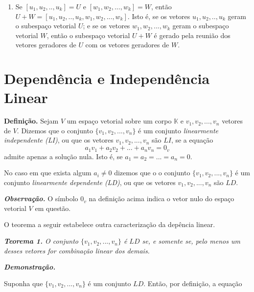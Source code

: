 \begin{enumerate}
\item  Se $[u_1,u_2,..,u_k]=U$ e $[w_1,w_2,...,w_k]=W$, então $U+W=[u_1,u_2,..,u_k, w_1,w_2,...,w_k]$. Isto é, se os vetores $u_1,u_2,..,u_k$ geram o subespaço vetorial $U$; e se os vetores $w_1,w_2,...,w_k$ geram o subespaço vetorial $W$, então o subespaço vetorial $U+W$ é gerado pela reunião dos vetores geradores de $U$ com os vetores geradores de $W$.

\end{enumerate}

\section{Dependência e Independência  Linear}

\textbf{Definição.} Sejam $V$ um espaço vetorial sobre um corpo  $\mathbb{K}$ e $v_1, v_2,..., v_n$ vetores de  $V$.  Dizemos que o conjunto $\{v_1, v_2,..., v_n\}$ é um conjunto \textit{linearmente independente (LI)}, ou que os vetores $v_1, v_2,..., v_n$  são $LI$, se a equação $$a_1v_1+a_2v_2+...+a_nv_n=0_v$$ admite apenas a solução nula.  Isto é, se $a_1=a_2=...=a_n=0$.

\vspace{0.3cm}

No caso em que exista algum $a_i \neq 0$ dizemos que o o conjunto $\{v_1, v_2,..., v_n\}$ é um conjunto \textit{linearmente dependente (LD)}, ou que os vetores $v_1, v_2,..., v_n$  são $LD$.

\vspace{0.3cm}

\textit{\textbf{Observação.}} O símbolo $0_v$ na definição acima indica o vetor nulo do espaço vetorial $V$ em questão.

\vspace{0.3cm}
O teorema a seguir estabelece outra caracterização da  depência linear.

\vspace{0.3cm}

 \textit{\textbf{Teorema 1.} O conjunto $\{v_1, v_2,..., v_n\}$ é $ LD$ se, e somente se, pelo menos um desses vetores for combinação linear dos demais.}

\vspace{0.3cm}

\textbf{\textit{Demonstração.}}

Suponha que $\{v_1, v_2,..., v_n\}$ é um conjunto $LD$.  Então, por definição,  a equação

